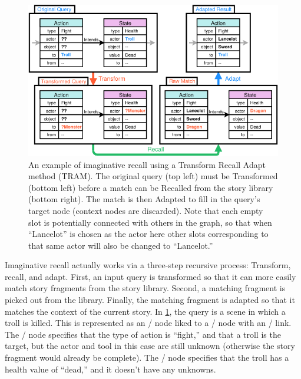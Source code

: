 \begin{figure}[!t]
\centering
\includegraphics[width=\textwidth]{fig/cropped-im-example.pdf}
\caption[Imaginative recall example]{An example of imaginative recall using a Transform Recall Adapt method (TRAM). The original query (top left) must be Transformed (bottom left) before a match can be Recalled from the story library (bottom right). The match is then Adapted to fill in the query's target node (context nodes are discarded). Note that each empty slot is potentially connected with others in the graph, so that when ``Lancelot'' is chosen as the actor here other slots corresponding to that same actor will also be changed to ``Lancelot.''}
\label{fig:im-example}
\end{figure}


Imaginative recall actually works via a three-step recursive process: Transform, recall, and adapt.
%
First, an input query is transformed so that it can more easily match story fragments from the story library.
%
Second, a matching fragment is picked out from the library.
%
Finally, the matching fragment is adapted so that it matches the context of the current story.
%
In \cref{fig:im-example}, the query is a scene in which a troll is killed.
%
This is represented as an \gna/ node liked to a \gns/ node with an \gei/ link.
%
The \gna/ node specifies that the type of action is ``fight,'' and that a troll is the target, but the actor and tool in this case are still unknown (otherwise the story fragment would already be complete).
%
The \gns/ node specifies that the troll has a health value of ``dead,'' and it doesn't have any unknowns.


